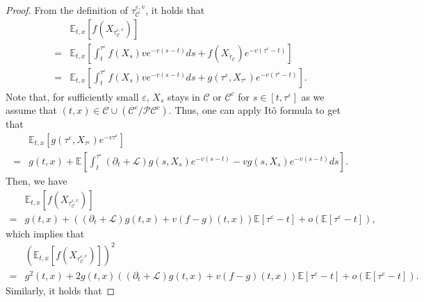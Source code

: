 \documentclass[11pt]{article}
\begin{document}
\begin{proof}
From the definition of $\tau_{\mathcal C}^{\varepsilon,v}$, it holds that  
\begin{equation*}
\begin{split}
&\mathbb E_{t,x}\left[f(X_{\tau_{\mathcal C}^{\varepsilon,v}}) \right]\\
=&\mathbb E_{t,x}\left[\int_t^{\tau^{\varepsilon}} f(X_s)ve^{-v(s-t)}ds+f(X_{\tilde \tau_{\mathcal C}}) e^{-v(\tau^{\varepsilon}-t)}\right]\\
=&\mathbb E_{t,x}\left[\int_t^{\tau^{\varepsilon}} f(X_s)ve^{-v(s-t)}ds+g(\tau^{\varepsilon},X_{\tau^{\varepsilon}}) e^{-v(\tau^{\varepsilon}-t)}\right].
\end{split}
\end{equation*}
Note that, for sufficiently small $\varepsilon$, $X_s$  stays in $\mathcal C$ or $\mathcal C^c$ for $s\in[t,\tau^\varepsilon]$ as we assume that $(t,x) \in \mathcal C \cup (\mathcal C^c/\mathcal P \mathcal C^c)$. Thus, one can apply It\^o formula to get that 
\begin{equation*}
\begin{split}
&\mathbb E_{t,x}\left[g(\tau^{\varepsilon},X_{\tau^{\varepsilon}}) e^{-v\tau^{\varepsilon}} \right]\\
=&g(t,x)+\mathbb E\left[ \int_t^{\tau^{\varepsilon}}(\partial_t+\mathcal L)g(s,X_s)e^{-v(s-t)}-vg(s,X_s)e^{-v(s-t)}ds\right].
\end{split}
\end{equation*}
Then, we have 
\begin{equation*}
\begin{split}
&\mathbb E_{t,x}\left[f(X_{\tau^{\varepsilon,v}_{\mathcal C}}) \right]\\
=&g(t,x)+\left((\partial_t+\mathcal L)g(t,x)+v(f-g)(t,x)\right)\mathbb E\left[\tau^{\varepsilon}-t\right]+o(\mathbb E\left[\tau^{\varepsilon}-t\right]),
\end{split}
\end{equation*}
which implies that 
\begin{equation*}
\begin{split}
&\left(\mathbb E_{t,x}\left[f(X_{\tau^{\varepsilon,v}_{\mathcal C}}) \right]\right)^2\\
=&g^2(t,x)+2g(t,x)\left((\partial_t+\mathcal L)g(t,x)+v(f-g)(t,x)\right)\mathbb E\left[\tau^{\varepsilon}-t\right]+o(\mathbb E\left[\tau^{\varepsilon}-t\right]).
\end{split}
\end{equation*}
Similarly, it holds that 

\end{proof}
\end{document}
